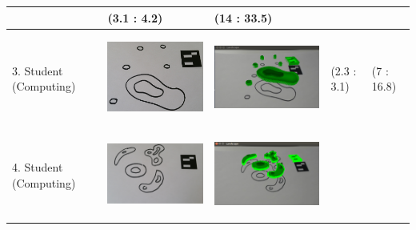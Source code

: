 \documentclass[11pt]{article}
\begin{document}
\begin{landscape}
\begin{longtable}{p{}| p{}| p{} | p{} |p{}}
							& (3.1 : 4.2)
							& (14 : 33.5)\\
\hline
3. Student (Computing) & \begin{center}\includegraphics[scale=0.5]{pics/usertesting/3.png}\end{center} 
							& \begin{center}\includegraphics[scale=0.5]{pics/usertesting/3render.png}\end{center} 
							& (2.3 : 3.1)
							& (7 : 16.8)\\
\hline
4. Student (Computing) & \begin{center}\includegraphics[scale=0.5]{pics/usertesting/4.png}\end{center} 
							& \begin{center}\includegraphics[scale=0.5]{pics/usertesting/4render.png}\end{center} 

\end{longtable}
\end{landscape}
\end{document}
